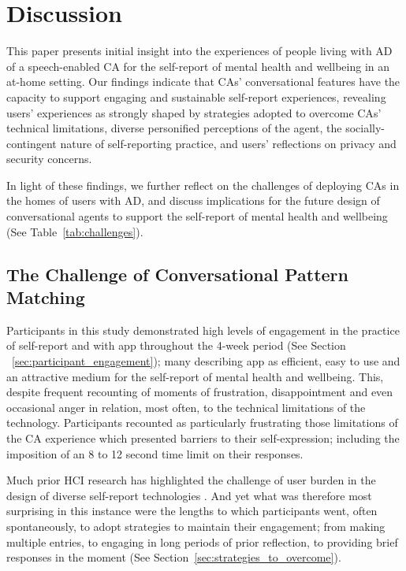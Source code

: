 \section{Discussion}

    This paper presents initial insight into the experiences of people living with \ac{AD} of a speech-enabled \ac{CA} for the self-report of mental health and wellbeing in an at-home setting. Our findings indicate that \ac{CA}s' conversational features have the capacity to support engaging and sustainable self-report experiences, revealing users' experiences as strongly shaped by strategies adopted to overcome \ac{CA}s' technical limitations, diverse personified perceptions of the agent, the socially-contingent nature of self-reporting practice, and users' reflections on privacy and security concerns.

    In light of these findings, we further reflect on the challenges of deploying \ac{CA}s in the homes of users with \ac{AD}, and discuss implications for the future design of conversational agents to support the self-report of mental health and wellbeing (See Table~\ref{tab:challenges}).
    
    
    
    \subsection{The Challenge of Conversational Pattern Matching} %

        Participants in this study demonstrated high levels of engagement in the practice of self-report and with \acl{app} throughout the 4-week period (See Section ~\ref{sec:participant_engagement}); many describing \acl{app} as efficient, easy to use and an attractive medium for the self-report of mental health and wellbeing. This, despite frequent recounting of moments of frustration, disappointment and even occasional anger in relation, most often, to the technical limitations of the technology. Participants recounted as particularly frustrating those limitations of the \ac{CA} experience which presented barriers to their self-expression; including the imposition of an 8 to 12 second time limit on their responses. 
        
        Much prior \ac{HCI} research has highlighted the challenge of user burden in the design of diverse self-report technologies \cite{harari2016using, van2017experience, doherty2020design}. And yet what was therefore most surprising in this instance were the lengths to which participants went, often spontaneously, to adopt strategies to maintain their engagement; from making multiple entries, to engaging in long periods of prior reflection, to providing brief responses in the moment (See Section~\ref{sec:strategies_to_overcome}). 
        
